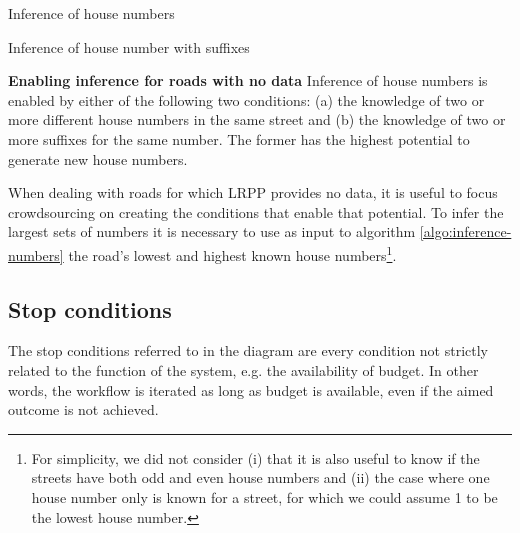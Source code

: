 \begin{algorithm}[H]
    \caption{Inference of house numbers}
    \label{algo:inference-numbers}
\end{algorithm}

\begin{algorithm}[H]
    \caption{Inference of house number with suffixes}
    \label{algo:inference-numbers-suffix}
\end{algorithm}

\textbf{Enabling inference for roads with no data} Inference of house numbers is enabled by either of the following two conditions: (a) the knowledge of two or more different house numbers in the same street and (b) the knowledge of two or more suffixes for the same number. The former has the highest potential to generate new house numbers.

When dealing with roads for which LRPP provides no data, it is useful to focus crowdsourcing on creating the conditions that enable that potential. To infer the largest sets of numbers it is necessary to use as input to algorithm \ref{algo:inference-numbers} the road's lowest and highest known house numbers\footnote{For simplicity, we did not consider (i) that it is also useful to know if the streets have both odd and even house numbers and (ii) the case where one house number only is known for a street, for which we could assume 1 to be the lowest house number.}.

\subsection{Stop conditions} 

The stop conditions referred to in the diagram are every condition not strictly related to the function of the system, e.g. the availability of budget. In other words, the workflow is iterated as long as budget is available, even if the aimed outcome is not achieved. 

